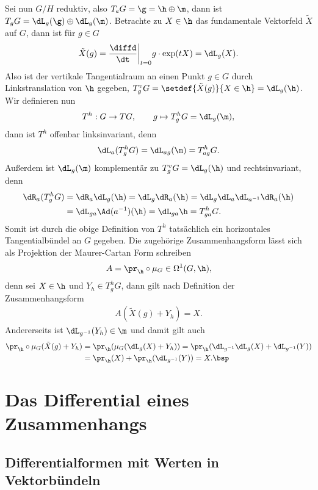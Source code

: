 \documentclass[%
	paper=a5,%
	fleqn,%
	DIV=18,%
	BCOR=0mm,
	fontsize=11pt,
	titlepage=false,%
	bibliography=totoc,
	DIV=18,%
	twoside=true,
	pdftitle=Riemannsche Geometrie,
	pdfauthor=Uwe Semmelmann,
	numbers=noendperiod]%
	{scrbook}
\begin{document}
\begin{ex}
Sei nun $G/H$ reduktiv, also $T_eG = \g = \h\oplus \m$, dann ist $T_gG =
\dL_g(\g)\oplus \dL_g(\m)$.
Betrachte zu $X\in\h$ das fundamentale Vektorfeld $\tilde{X}$ auf $G$, dann ist
für $g\in G$
\begin{align*}
\tilde{X}(g) = \frac{\diffd}{\dt}\bigg|_{t=0} g\cdot \exp(tX)
= \dL_g(X).
\end{align*}
Also ist der vertikale Tangentialraum an einen Punkt $g\in G$ durch
Linkstranslation von $\h$ gegeben, $T^v_g G = \setdef{\tilde{X}(g)}{X\in \h} =
\dL_g(\h)$. Wir definieren nun
\begin{align*}
T^h : G\to TG,\qquad g\mapsto T_g^hG = \dL_g(\m), 
\end{align*}
dann ist $T^h$ offenbar linksinvariant, denn
\begin{align*}
\dL_a(T^h_gG) = \dL_{ag}(\m) = T_{ag}^hG.
\end{align*}
Außerdem ist $\dL_g(\m)$ komplementär zu $T_g^vG = \dL_g(\h)$ und
rechtsinvariant, denn
\begin{align*}
\dR_a(T_g^hG) &= \dR_a\dL_g(\h) = 
\dL_g\dR_a(\h) = 
\dL_g\dL_a \dL_{a^{-1}}\dR_a(\h)\\
&= \dL_{ga}\Ad(a^{-1})(\h)
=   \dL_{ga}\h = T_{ga}^h G.
\end{align*}
Somit ist durch die obige Definition von $T^h$ tatsächlich ein horizontales
Tangentialbündel an $G$ gegeben. Die zugehörige Zusammenhangsform lässt sich als
Projektion der Maurer-Cartan Form schreiben
\begin{align*}
A = \pr_{\h}\circ\mu_G \in\Omega^1(G,\h),
\end{align*} 
denn sei $X\in\h$ und $Y_h\in T_g^h G$, dann gilt nach Definition der
Zusammenhangsform
\begin{align*}
A(\tilde{X}(g) + Y_h) = X.
\end{align*}
Andererseits ist $\dL_{g^{-1}}(Y_h) \in \m$ und damit gilt auch
\begin{align*}
\pr_{\h}\circ \mu_G(\tilde{X}(g) + Y_h) &= 
\pr_{\h}(\mu_G(\dL_g(X)+Y_h))
= \pr_{\h}(\dL_{g^{-1}}\dL_g(X) + \dL_{g^{-1}}(Y))\\
&= \pr_{\h}(X) + \pr_{\h}(\dL_{g^{-1}}(Y))
= X.\bsp
\end{align*}
\end{ex}

\chapter{Das Differential eines Zusammenhangs}

\section{Differentialformen mit Werten in Vektorbündeln}
\end{document}

